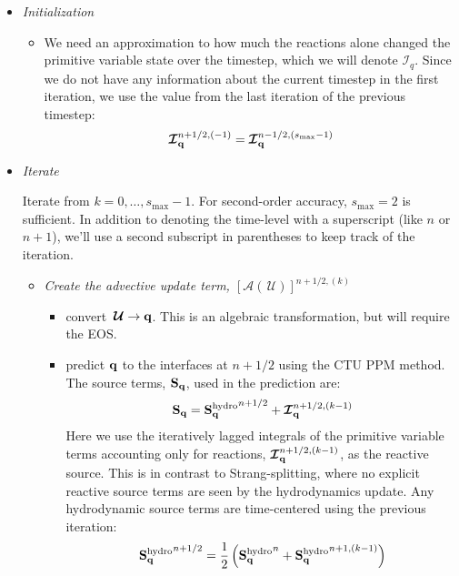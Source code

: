 \documentclass[times,modern]{aastex63}
\newcommand{\Ic}{{\boldsymbol{\mathcal{I}}}}
\newcommand{\smax}{{s_\mathrm{max}}}
\newcommand{\Uc}{{\,\bm{\mathcal{U}}}}
\newcommand{\Sq}{{\bf S}_\qb}
\newcommand{\Sqhydro}{{\Sq^{\mathrm{hydro}}}}
\newcommand{\qb}{{\bf q}}
\newcommand{\Adv}[1]{{\left [\boldsymbol{\mathcal{A}} \left(#1\right)\right]}}
\begin{document}
\begin{itemize}

\item {\em Initialization}

\label{sec:initialization}

  \begin{itemize}
  \item We need an approximation to how much the reactions alone
    changed the primitive variable state over the timestep, which we
    will denote $\Ic_q$.  Since we do not have any information about
    the current timestep in the first iteration,
    we use the value from the last iteration of the previous timestep:
    \begin{equation}
      \Ic^{n+1/2,(-1)}_{\qb} = \Ic^{n-1/2,(\smax-1)}_{\qb}
    \end{equation}


  \end{itemize}

\item {\em Iterate}

  Iterate from $k = 0, \ldots, \smax-1$.  For second-order accuracy,
  $\smax = 2$ is sufficient.  In addition to denoting the time-level
  with a superscript (like $n$ or $n+1$), we'll use a second subscript
  in parentheses to keep track of the iteration.

  \begin{itemize}
  \item {\em Create the advective update term, $\Adv{\Uc}^{n+1/2,(k)}$}

    \begin{itemize}
    \item convert $\Uc \rightarrow \qb$.  This is an algebraic transformation,
      but will require the EOS.

    \item predict $\qb$ to the interfaces at $n+1/2$ using the CTU PPM
      method.  The source terms, $\Sq$, used in the prediction are:
      \begin{equation}
        \Sq = \Sqhydro^{n+1/2} + \Ic_\qb^{n+1/2,(k-1)}
      \end{equation}
      Here we use the iteratively lagged integrals of the primitive variable
      terms accounting only for reactions, $\Ic_\qb^{n+1/2,(k-1)}$, as the
      reactive source.  This is in contrast to Strang-splitting, where no
      explicit reactive source terms are seen by the hydrodynamics update.
      Any hydrodynamic source terms are time-centered
      using the previous iteration:
      \begin{equation}
        \Sqhydro^{n+1/2} = \frac{1}{2} \left ( \Sqhydro^n + \Sqhydro^{n+1,(k-1)} \right )
      \end{equation}


\end{itemize}
\end{itemize}
\end{itemize}
\end{document}
